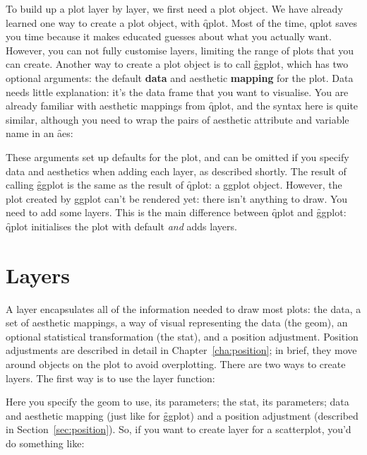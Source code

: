 To build up a plot layer by layer, we first need a plot object.  We have already learned one way to create a plot object, with \f{qplot}.  Most of the time, qplot saves you time because it makes educated guesses about what you actually want.  However, you can not fully customise layers, limiting the range of plots that you can create.  Another way to create a plot object is to call \f{ggplot}, which has two optional arguments: the default {\bf data} and aesthetic {\bf mapping} for the plot.  Data needs little explanation: it's the data frame that you want to visualise.  You are already familiar with aesthetic mappings from \f{qplot}, and the syntax here is quite similar, although you need to wrap the pairs of aesthetic attribute and variable name in an \f{aes}:

% 


These arguments set up defaults for the plot, and can be omitted if you specify data and aesthetics when adding each layer, as described shortly.   The result of calling \f{ggplot} is the same as the result of \f{qplot}: a ggplot object.  However, the plot created by ggplot can't be rendered yet: there isn't anything to draw.  You need to add some layers.  This is the main difference between \f{qplot} and \f{ggplot}: \f{qplot} initialises the plot with default \emph{and} adds layers.  

\section{Layers}
\label{sec:layers}

A layer encapsulates all of the information needed to draw most plots:  the data, a set of aesthetic mappings, a way of visual representing the data (the geom), an optional statistical transformation (the stat), and a position adjustment.  Position adjustments are described in detail in Chapter~\ref{cha:position}; in brief, they move around objects on the plot to avoid overplotting.  There are two ways to create layers.  The first way is to use the layer function:

% 


\noindent Here you specify the geom to use, its parameters; the stat, its parameters; data and aesthetic mapping (just like for \f{ggplot}) and a position adjustment (described in Section~\ref{sec:position}).  So, if you want to create layer for a scatterplot, you'd do something like:

